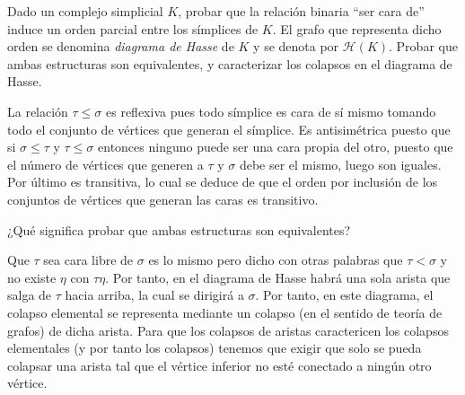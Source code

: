 \documentclass[twoside]{article}
\begin{document}
\newpage

\begin{ejercicio}{1.8}
Dado un complejo simplicial $K$, probar que la relación binaria ``ser cara de'' induce un orden parcial entre los símplices de $K$.
El grafo que representa dicho orden se denomina \emph{diagrama de Hasse} de $K$ y se denota por $\mathcal{H}(K)$.
Probar que ambas estructuras son equivalentes, y caracterizar los colapsos en el diagrama de Hasse.
\end{ejercicio}
\begin{solucion}
La relación $\tau\leq\sigma$ es reflexiva pues todo símplice es cara de sí mismo tomando todo el conjunto de vértices que generan el símplice. Es antisimétrica puesto que si $\sigma\leq\tau$ y $\tau\leq\sigma$ entonces ninguno puede ser una cara propia del otro, puesto que el número de vértices que generen a $\tau$ y $\sigma$ debe ser el mismo, luego son iguales. Por último es transitiva, lo cual se deduce de que el orden por inclusión de los conjuntos de vértices que generan las caras es transitivo.

¿Qué significa probar que ambas estructuras son equivalentes?

Que $\tau$ sea cara libre de $\sigma$ es lo mismo pero dicho con otras palabras que $\tau<\sigma$ y no existe $\eta$ con $\tau\eta$. Por tanto, en el diagrama de Hasse habrá una sola arista que salga de $\tau$ hacia arriba, la cual se dirigirá a $\sigma$. Por tanto, en este diagrama, el colapso elemental se representa mediante un colapso (en el sentido de teoría de grafos) de dicha arista. Para que los colapsos de aristas caractericen los colapsos elementales (y por tanto los colapsos) tenemos que exigir que solo se pueda colapsar una arista tal que el vértice inferior no esté conectado a ningún otro vértice. 
\end{solucion}

\newpage
\end{document}
